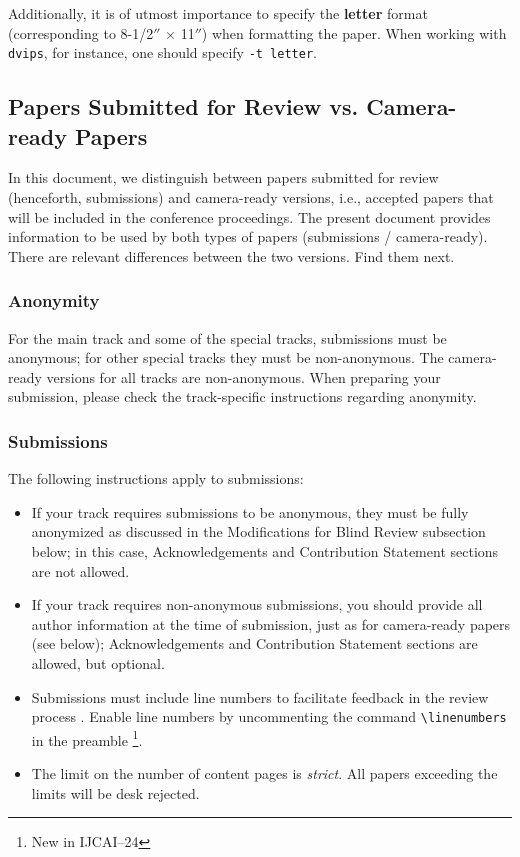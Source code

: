\documentclass{article}
\begin{document}
Additionally, it is of utmost importance to specify the {\bf
        letter} format (corresponding to 8-1/2$''$ $\times$ 11$''$) when
formatting the paper. When working with {\tt dvips}, for instance, one
should specify {\tt -t letter}.

\subsection{Papers Submitted for Review vs. Camera-ready Papers}
In this document, we distinguish between papers submitted for review (henceforth, submissions) and camera-ready versions, i.e., accepted papers that will be included in the conference proceedings. The present document provides information to be used by both types of papers (submissions / camera-ready). There are relevant differences between the two versions. Find them next.

\subsubsection{Anonymity}
For the main track and some of the special tracks, submissions must be anonymous; for other special tracks they must be non-anonymous. The camera-ready versions for all tracks are non-anonymous. When preparing your submission, please check the track-specific instructions regarding anonymity.

\subsubsection{Submissions}
The following instructions apply to submissions:
\begin{itemize}
\item If your track requires submissions to be anonymous, they must be fully anonymized as discussed in the Modifications for Blind Review subsection below; in this case, Acknowledgements and Contribution Statement sections are not allowed.

\item If your track requires non-anonymous submissions, you should provide all author information at the time of submission, just as for camera-ready papers (see below); Acknowledgements and Contribution Statement sections are allowed, but optional.

\item Submissions must include line numbers to facilitate feedback in the review process . Enable line numbers by uncommenting the command {\tt \textbackslash{}linenumbers} in the preamble \footnote{New in IJCAI--24}.

\item The limit on the number of  content pages is \emph{strict}. All papers exceeding the limits will be desk rejected.
\end{itemize}
\end{document}
